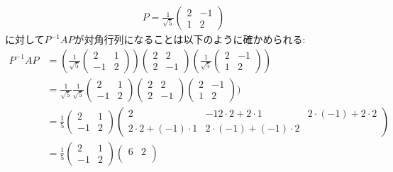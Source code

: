 \begin{checkanswer}%
  \begin{align*}
     P=\frac{1}{\sqrt{5}}
    \begin{pmatrix}
      2&-1\\
      1&2
    \end{pmatrix}
  \end{align*}
  に対して$P^{-1}AP$が対角行列になることは以下のように確かめられる:
  \begin{align*}
    P^{-1}AP
    &=
    (\frac{1}{\sqrt{5}}
    \begin{pmatrix}
      2&1\\
      -1&2
    \end{pmatrix})
    \begin{pmatrix}
      2&2\\2&-1
    \end{pmatrix}
    (\frac{1}{\sqrt{5}}
    \begin{pmatrix}
      2&-1\\
      1&2
    \end{pmatrix})\\
    &=
    \frac{1}{\sqrt{5}}
    \frac{1}{\sqrt{5}}
    \begin{pmatrix}
      2&1\\
      -1&2
    \end{pmatrix}
    \begin{pmatrix}
      2&2\\2&-1
    \end{pmatrix}
    \begin{pmatrix}
      2&-1\\
      1&2
    \end{pmatrix})\\
    &=
    \frac{1}{5}
    \begin{pmatrix}
      2&1\\
      -1&2
    \end{pmatrix}
    \begin{pmatrix}2&-1
      2\cdot 2+2\cdot 1&2\cdot(-1)+2\cdot 2\\
      2\cdot 2+(-1)\cdot 1&2\cdot(-1)+(-1)\cdot 2
    \end{pmatrix}\\
    &=
    \frac{1}{5}
    \begin{pmatrix}
      2&1\\
      -1&2
    \end{pmatrix}
    \begin{pmatrix}
      6&2\\

\end{pmatrix}
\end{align*}
\end{checkanswer}
